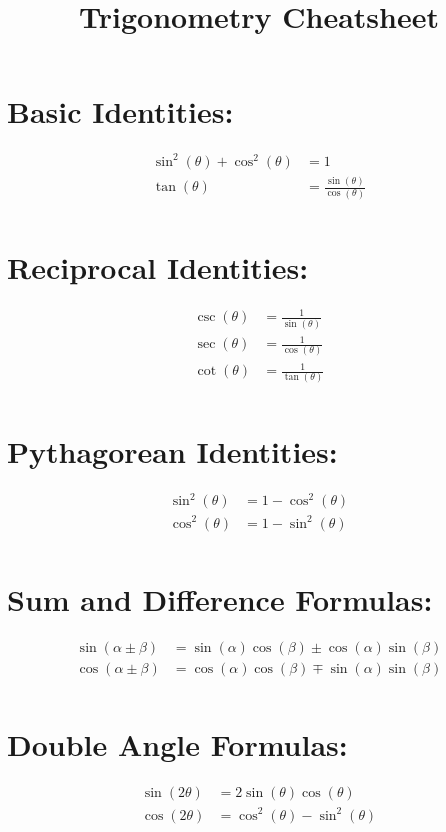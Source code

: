 \documentclass[twocolumn]{article}
\begin{document}
\title{Trigonometry Cheatsheet}
\author{}
\date{}
\maketitle

\section*{Basic Identities:}
\begin{align*}
    \sin^2(\theta) + \cos^2(\theta) &= 1 \\
    \tan(\theta) &= \frac{\sin(\theta)}{\cos(\theta)} \\
\end{align*}

\section*{Reciprocal Identities:}
\begin{align*}
    \csc(\theta) &= \frac{1}{\sin(\theta)} \\
    \sec(\theta) &= \frac{1}{\cos(\theta)} \\
    \cot(\theta) &= \frac{1}{\tan(\theta)} \\
\end{align*}

\section*{Pythagorean Identities:}
\begin{align*}
    \sin^2(\theta) &= 1 - \cos^2(\theta) \\
    \cos^2(\theta) &= 1 - \sin^2(\theta) \\
\end{align*}

\section*{Sum and Difference Formulas:}
\begin{align*}
    \sin(\alpha \pm \beta) &= \sin(\alpha)\cos(\beta) \pm \cos(\alpha)\sin(\beta) \\
    \cos(\alpha \pm \beta) &= \cos(\alpha)\cos(\beta) \mp \sin(\alpha)\sin(\beta) \\
\end{align*}

\section*{Double Angle Formulas:}
\begin{align*}
    \sin(2\theta) &= 2\sin(\theta)\cos(\theta) \\
    \cos(2\theta) &= \cos^2(\theta) - \sin^2(\theta) \\
\end{align*}
\end{document}

